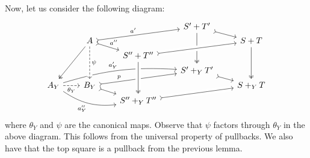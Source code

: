 \documentclass[11pt]{amsart}
\theoremstyle{remark}
\theoremstyle{definition}
\begin{document}
%
%
%
%
%
%
Now, let us consider the following diagram:
%
\begin{equation}
\label{diag.the big cube}
\begin{tikzcd}[row sep=.2em,column sep=2em]
	{} &
	{} &
	{} &
	{S'+T'} 
		\ar[rd,rightarrowtail] 
		\ar[ddd,twoheadrightarrow]&
	{} \\
	{} &
	{A} 
		\ar[urr,rightarrowtail,"a'"] 
		\ar[dr,rightarrowtail, "a''"] 
		\ar[dddl,twoheadrightarrow] &
	{} &
	{} &
	{S+T} 
		\ar[ddd,twoheadrightarrow]\\
	{} &
	{} &
	{S''+T''} &
	{} &
	{} \\
	{} &
	{} &
	{} &
	{S'+_YT'} 
		\ar[dr,rightarrowtail]&
	{} \\
	{A_Y} 
		\ar[rrru,bend left=10,"a'_Y"] 
		\ar[r,dashed,"\theta_Y"'] 	
		\ar[rrd,bend right=20,swap,"a''_Y"] &
	{B_Y} 
		\ar[rru,rightarrowtail,"p", pos=.3] &
	{} &
	{} &
	{S+_YT} \\
	{} &
	{} &
	{S''+_YT''} &
	{} &
	{}
		\ar[from=2-2,to=5-2,crossing over,dashed,"\psi"]
		\ar[from=3-3,to=2-5,crossing over,rightarrowtail]
		\ar[from=3-3,to=6-3,crossing over,twoheadrightarrow]
		\ar[from=5-2,to=6-3,crossing over,rightarrowtail]
		\ar[from=6-3,to=5-5,crossing over,rightarrowtail]
\end{tikzcd}
\end{equation}
%
where $\theta_Y$ and $\psi$ are the canonical maps. Observe that $\psi$ factors through $\theta_Y$ in the above diagram.  This follows from the universal property of pullbacks. We also have that the top square is a pullback from the previous lemma.
%
%
%
%
%
%
\end{document}
